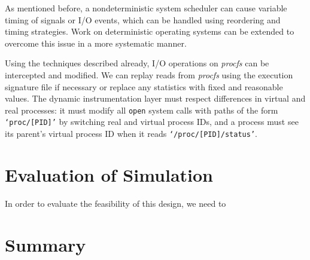 As mentioned before, a nondeterministic system scheduler
can cause variable timing of signals
or I/O events, which
can be handled using reordering and
timing strategies.
Work on deterministic
operating systems can
be extended to overcome this issue
in a more systematic manner. \newline

 \newline
Using the techniques described
already, I/O operations on {\em procfs} can be intercepted
and modified. We can 
replay reads from {\em procfs} using the execution signature
file if necessary or replace any statistics with fixed and 
reasonable values. The dynamic instrumentation layer 
must respect differences in virtual and real processes:
it must modify all \texttt{open} system calls with paths
of the form \texttt{`proc/[PID]'}
by switching real and virtual process IDs,
and a process must see its 
parent's virtual process ID when it reads
\texttt{`/proc/[PID]/status'}.









\section{Evaluation of Simulation} \label{sileval}
In order to evaluate the feasibility of this design,
we need to 
\section {Summary}

